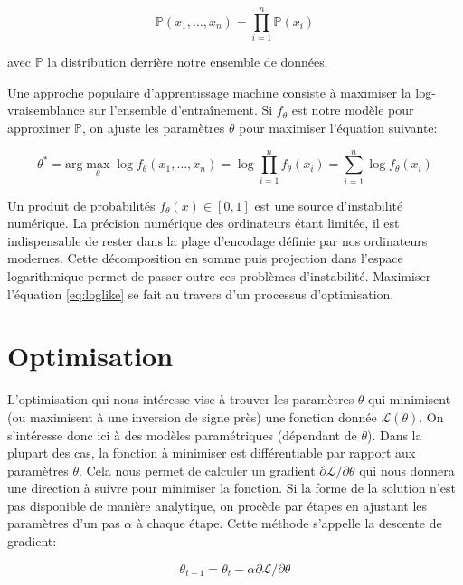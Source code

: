 \begin{equation}
\mathbb{P}(x_{1}, \dots, x_{n}) = \prod_{i=1}^{n}\mathbb{P}(x_{i})
\end{equation}

avec $\mathbb{P}$ la distribution derrière notre ensemble de données.

Une approche populaire d'apprentissage machine consiste à maximiser la
log-vraisemblance sur l'ensemble d'entraînement. 
Si $f_{\theta}$ est notre
modèle pour approximer $\mathbb{P}$, on ajuste les paramètres $\theta$ pour
maximiser l'équation suivante:

\begin{equation}
\label{eq:loglike}
\theta^{*}=\textrm{arg}\max_{\theta} \log f_{\theta}(x_{1}, \dots, x_{n}) = \log \prod_{i=1}^{n}f_{\theta}(x_{i}) = \sum_{i=1}^{n}\log f_{\theta}(x_{i})
\end{equation}

Un produit de probabilités $f_{\theta}(x)\in [0,1]$ est une source
d'instabilité numérique. La précision numérique des ordinateurs étant limitée,
il est indispensable de rester dans la plage d'encodage définie par nos
ordinateurs modernes. Cette décomposition en somme puis projection dans
l'espace logarithmique permet de passer outre ces problèmes d'instabilité.
Maximiser l'équation \ref{eq:loglike} se fait au travers d'un processus
d'optimisation. 
 
\section{Optimisation}

L'optimisation qui nous intéresse vise à trouver les paramètres $\theta$ qui
minimisent (ou maximisent à une inversion de signe près) une fonction donnée
$\mathcal{L}(\theta)$.  On s'intéresse donc ici à des modèles paramétriques
(dépendant de $\theta$). Dans la plupart des cas, la fonction à minimiser est
différentiable par rapport aux paramètres $\theta$.  Cela nous permet de
calculer un gradient $\partial \mathcal{L}/\partial\theta$ qui nous donnera une
direction à suivre pour minimiser la fonction. Si la forme de la solution n'est
pas disponible de manière analytique, on procède par étapes en ajustant les
paramètres d'un pas $\alpha$ à chaque étape. Cette méthode s'appelle la
descente de gradient:

\begin{equation}
\theta_{t+1} = \theta_{t} - \alpha \partial \mathcal{L}/\partial\theta
\end{equation}


